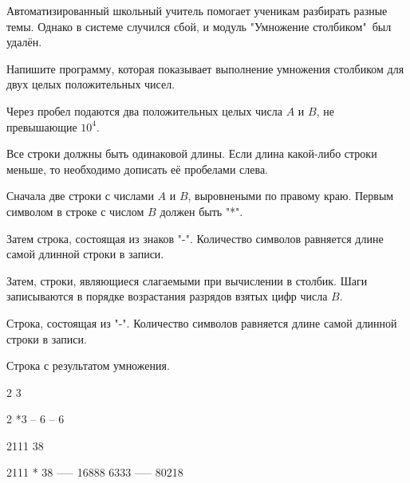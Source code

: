 
Автоматизированный школьный учитель помогает ученикам разбирать разные темы. Однако в системе случился сбой, и модуль "Умножение столбиком"\ был удалён.

Напишите программу, которая показывает выполнение умножения столбиком для двух целых положительных чисел.


Через пробел подаются два положительных целых числа $A$ и $B$, не превышающие $10^4$.

\outputfmtSection

Все строки должны быть одинаковой длины. Если длина какой-либо строки меньше, то необходимо дописать её пробелами слева.

Сначала две строки с числами $A$ и $B$, выровнеными по правому краю. Первым символом в строке с числом $B$ должен быть "*".

Затем строка, состоящая из знаков "-". Количество символов равняется длине самой длинной строки в записи.

Затем, строки, являющиеся слагаемыми при вычислении в столбик. Шаги записываются в порядке возрастания разрядов взятых цифр числа $B$.

Строка, состоящая из "-". Количество символов равняется длине самой длинной строки в записи.

Строка с результатом умножения.


\begin{myverbbox}[\small]{\vinput}
    2 3
\end{myverbbox}
\begin{myverbbox}[\small]{\voutput}
     2
    *3
    --
     6
    --
     6
\end{myverbbox}


\begin{myverbbox}[\small]{\vinput}
    2111 38
\end{myverbbox}
\begin{myverbbox}[\small]{\voutput}
     2111
    *  38
    -----
    16888
    6333 
    -----
    80218
\end{myverbbox}

